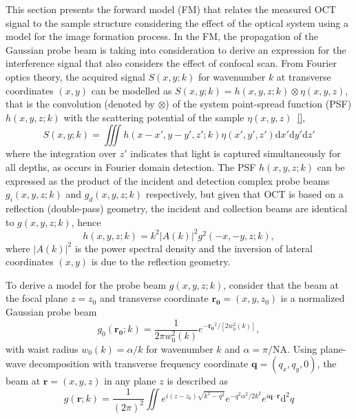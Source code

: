 This section presents the forward model (FM) that relates the measured OCT signal to the sample structure considering the effect of the optical system using a model for the image formation process. In the FM, the propagation of the Gaussian probe beam is taking into consideration to derive an expression for the interference signal that also considers the effect of confocal scan. From Fourier optics theory, the acquired signal $S(x,y; k)$ for wavenumber $k$ at transverse coordinates $(x,y)$ can be modelled as $S(x,y; k)= h(x,y,z; k)\otimes\eta(x,y,z)$, that is the convolution (denoted by $\otimes$) of the system point-spread function (PSF) $h(x,y,z; k)$ with the scattering potential of the sample $\eta(x,y,z)$~\ref{},
\begin{equation}\label{eq:conv}
    S(x,y; k) = \iiint h(x-x', y-y', z'; k) \eta(x',y',z') \text{d}x' \text{d}y' \text{d}z'
\end{equation}
where the integration over $z'$ indicates that light is captured simultaneously for all depths, as occurs in Fourier domain detection. The PSF $h(x,y,z; k)$ can be expressed as the product of the incident and detection complex probe beams $g_i(x,y,z;k)$ and $g_d(x,y,z;k)$ respectively, but given that OCT is based on a reflection (double-pass) geometry, the incident and collection beams are identical to $g(x,y,z;k)$, hence
\begin{equation}\label{eq:PSF1}
    h(x,y,z; k) =k^2|A(k)|^2g^2(-x, -y, z; k),
\end{equation}
where $|A(k)|^2$ is the power spectral density and the inversion of lateral coordinates $(x,y)$ is due to the reflection geometry.

To derive a model for the probe beam $g(x,y,z;k)$, consider that the beam at the focal plane $z=z_0$ and transverse coordinate $\mathbf{r_0} = (x,y,z_0)$ is a normalized Gaussian probe beam
\begin{equation}\label{}
    g_0(\mathbf{r_0}; k) = \frac{1}{2\pi w_0^2(k)}e^{-\mathbf{r_0}^2/[2w_0^2(k)]},
\end{equation}
with waist radius $w_0(k) = \alpha / k$ for wavenumber $k$ and $\alpha = \pi/\text{NA}$. Using plane-wave decomposition with transverse frequency coordinate $\mathbf{q} = (q_x, q_y, 0)$, the beam at $\mathbf{r} = (x, y, z)$ in any plane $z$ is described as
\begin{equation}\label{}
    g(\mathbf{r}; k) = \frac{1}{(2\pi)^2} \iint e^{i(z-z_0)\sqrt{k^2 - q^2}} e^{-q^2\alpha^2/2k^2} e^{i\mathbf{q}\cdot\mathbf{r}} \text{d}^2q
\end{equation}

